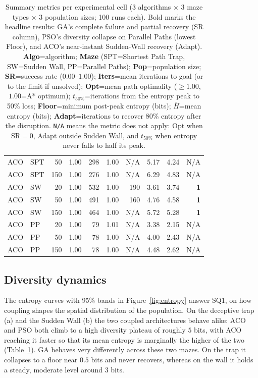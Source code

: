 \documentclass[11pt,a4paper]{article}
\begin{document}
\begin{table}[ht]
\begin{tabular}{llrrrrrrrr}
            ACO & SPT & 50 & 1.00 & 298 & 1.00 & N/A & 5.17 & 4.24 & N/A \\
            ACO & SPT & 150 & 1.00 & 276 & 1.00 & N/A & 6.29 & 4.83 & N/A \\
            ACO & SW & 20 & 1.00 & 532 & 1.00 & 190 & 3.61 & 3.74 & \textbf{1} \\
            ACO & SW & 50 & 1.00 & 491 & 1.00 & 160 & 4.76 & 4.58 & \textbf{1} \\
            ACO & SW & 150 & 1.00 & 464 & 1.00 & N/A & 5.72 & 5.28 & \textbf{1} \\
            ACO & PP & 20 & 1.00 & 79 & 1.01 & N/A & 3.38 & 2.15 & N/A \\
            ACO & PP & 50 & 1.00 & 78 & 1.00 & N/A & 4.00 & 2.43 & N/A \\
            ACO & PP & 150 & 1.00 & 78 & 1.00 & N/A & 4.48 & 2.62 & N/A \\
            \bottomrule
        \end{tabular}
        \caption{Summary metrics per experimental cell (3 algorithms $\times$ 3 maze types $\times$ 3 population sizes; 100 runs each). Bold marks the headline results: GA's complete failure and partial recovery (SR column), PSO's diversity collapse on Parallel Paths (lowest Floor), and ACO's near-instant Sudden-Wall recovery (Adapt). \textbf{Algo}=algorithm; \textbf{Maze} (SPT=Shortest Path Trap, SW=Sudden Wall, PP=Parallel Paths); \textbf{Pop}=population size; \textbf{SR}=success rate ($0.00$--$1.00$); \textbf{Iters}=mean iterations to goal (or to the limit if unsolved); \textbf{Opt}=mean path optimality ($\geq 1.00$, $1.00$=A* optimum); \textbf{$t_{50\%}$}=iterations from the entropy peak to 50\% loss; \textbf{Floor}=minimum post-peak entropy (bits); \textbf{$\bar{H}$}=mean entropy (bits); \textbf{Adapt}=iterations to recover 80\% entropy after the disruption. \texttt{N/A} means the metric does not apply: Opt when SR$=0$, Adapt outside Sudden Wall, and $t_{50\%}$ when entropy never falls to half its peak.}
        \label{tab:summary}
    \end{table}

    \subsection{Diversity dynamics}
    The entropy curves with 95\% bands in Figure~\ref{fig:entropy} answer SQ1, on how coupling shapes the spatial distribution of the population. On the deceptive trap (a) and the Sudden Wall (b) the two coupled architectures behave alike: ACO and PSO both climb to a high diversity plateau of roughly $5$ bits, with ACO reaching it faster so that its mean entropy is marginally the higher of the two (Table~\ref{tab:summary}). GA behaves very differently across these two mazes. On the trap it collapses to a floor near $0.5$ bits and never recovers, whereas on the wall it holds a steady, moderate level around $3$ bits.
\end{document}
